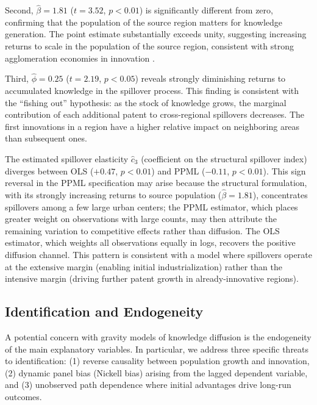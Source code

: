 \documentclass[letterpaper,12pt,leqno]{article}
\begin{document}
Second, \(\hat{\beta} = 1.81\) (\(t = 3.52\), \(p < 0.01\)) is significantly different from zero, confirming that the population of the source region matters for knowledge generation. The point estimate substantially exceeds unity, suggesting increasing returns to scale in the population of the source region, consistent with strong agglomeration economies in innovation \citep{jaffe1993geographic}.

Third, \(\hat{\phi} = 0.25\) (\(t = 2.19\), \(p < 0.05\)) reveals strongly diminishing returns to accumulated knowledge in the spillover process. This finding is consistent with the ``fishing out'' hypothesis: as the stock of knowledge grows, the marginal contribution of each additional patent to cross-regional spillovers decreases. The first innovations in a region have a higher relative impact on neighboring areas than subsequent ones.

The estimated spillover elasticity \(\hat{c}_3\) (coefficient on the structural spillover index) diverges between OLS (\(+0.47\), \(p < 0.01\)) and PPML (\(-0.11\), \(p < 0.01\)). This sign reversal in the PPML specification may arise because the structural formulation, with its strongly increasing returns to source population (\(\hat{\beta} = 1.81\)), concentrates spillovers among a few large urban centers; the PPML estimator, which places greater weight on observations with large counts, may then attribute the remaining variation to competitive effects rather than diffusion. The OLS estimator, which weights all observations equally in logs, recovers the positive diffusion channel. This pattern is consistent with a model where spillovers operate at the extensive margin (enabling initial industrialization) rather than the intensive margin (driving further patent growth in already-innovative regions).

\subsection{Identification and Endogeneity}
\label{sec:endogeneity}

A potential concern with gravity models of knowledge diffusion is the endogeneity of the main explanatory variables. In particular, we address three specific threats to identification: (1) reverse causality between population growth and innovation, (2) dynamic panel bias (Nickell bias) arising from the lagged dependent variable, and (3) unobserved path dependence where initial advantages drive long-run outcomes.
\end{document}
